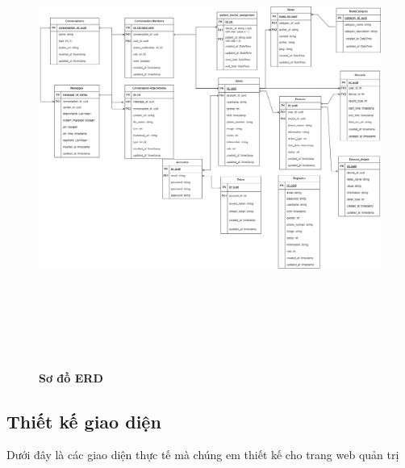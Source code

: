 \begin{figure}[H]
  \centering
  \includegraphics[width=15cm,height=15cm]{Images/system/fmECG_database.png}
  \caption[Sơ đồ ERD]{\bfseries \fontsize{12pt}{0pt}\selectfont Sơ đồ ERD}
  \label{fmECG_architecture-Database} %
\end{figure}

\subsection{Thiết kế giao diện}

Dưới đây là các giao diện thực tế mà chúng em thiết kế cho trang web quản trị

